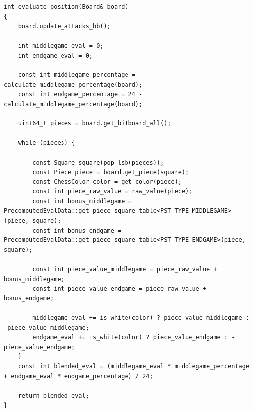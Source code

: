 \begin{lstlisting}[breaklines=true, frame=single, caption={Counting pieces and depending on game phase evaluation.}]
int evaluate_position(Board& board)
{
    board.update_attacks_bb();

    int middlegame_eval = 0;
    int endgame_eval = 0;

    const int middlegame_percentage = calculate_middlegame_percentage(board);
    const int endgame_percentage = 24 - calculate_middlegame_percentage(board);

    uint64_t pieces = board.get_bitboard_all();

    while (pieces) {

        const Square square(pop_lsb(pieces));
        const Piece piece = board.get_piece(square);
        const ChessColor color = get_color(piece);
        const int piece_raw_value = raw_value(piece);
        const int bonus_middlegame = PrecomputedEvalData::get_piece_square_table<PST_TYPE_MIDDLEGAME>(piece, square);
        const int bonus_endgame = PrecomputedEvalData::get_piece_square_table<PST_TYPE_ENDGAME>(piece, square);

        const int piece_value_middlegame = piece_raw_value + bonus_middlegame;
        const int piece_value_endgame = piece_raw_value + bonus_endgame;

        middlegame_eval += is_white(color) ? piece_value_middlegame : -piece_value_middlegame;
        endgame_eval += is_white(color) ? piece_value_endgame : -piece_value_endgame;
    }
    const int blended_eval = (middlegame_eval * middlegame_percentage + endgame_eval * endgame_percentage) / 24;

    return blended_eval;
}
\end{lstlisting}

